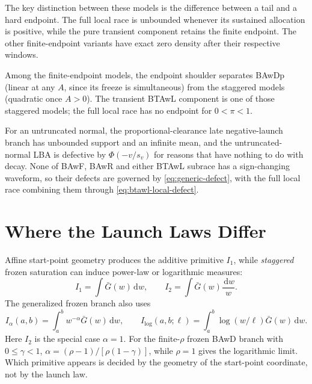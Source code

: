 \documentclass[12pt]{article}
\newcommand{\dd}{\,\mathrm{d}}
\newcommand{\PhiN}{\Phi}
\newcommand{\Gbar}{\bar{G}}
\theoremstyle{remark}
\begin{document}
The key distinction between these models is the difference between a tail and a hard endpoint.  The full local race is unbounded whenever its sustained allocation is positive, while the pure transient component retains the finite endpoint.  The other finite-endpoint variants have exact zero density after their respective windows.

Among the finite-endpoint models, the endpoint shoulder separates BAwDp (linear at any $A$, since its freeze is simultaneous) from the staggered models (quadratic once $A>0$).  The transient BTAwL component is one of those staggered models; the full local race has no endpoint for $0<\pi<1$.

For an untruncated normal, the proportional-clearance late negative-launch branch has unbounded support and an infinite mean, and the untruncated-normal LBA is defective by $\PhiN(-v/s_v)$ for reasons that have nothing to do with decay. None of BAwF, BAwR and either BTAwL subrace has a sign-changing waveform, so their defects are governed by \eqref{eq:generic-defect}, with the full local race combining them through \eqref{eq:btawl-local-defect}.

\section{Where the Launch Laws Differ}
\label{sec:closure}
Affine start-point geometry produces the additive primitive $I_1$, while \emph{staggered} frozen saturation can induce power-law or logarithmic measures:
\begin{equation}
 I_1=\int \Gbar(w)\dd w,\qquad
 I_2=\int \Gbar(w)\frac{\dd w}{w}.
 \label{eq:two-integrals}
\end{equation}
The generalized frozen branch also uses
\begin{equation}
 I_\alpha(a,b)=\int_a^b w^{-\alpha}\Gbar(w)\dd w,\qquad
 I_{\log}(a,b;\ell)=\int_a^b\log(w/\ell)\Gbar(w)\dd w.
 \label{eq:bawd-closure-primitives}
\end{equation}
Here $I_2$ is the special case $\alpha=1$. For the finite-$\rho$ frozen BAwD branch with $0\le\gamma<1$, $\alpha=(\rho-1)/[\rho(1-\gamma)]$, while $\rho=1$ gives the logarithmic limit. Which primitive appears is decided by the geometry of the start-point coordinate, not by the launch law.
\end{document}
